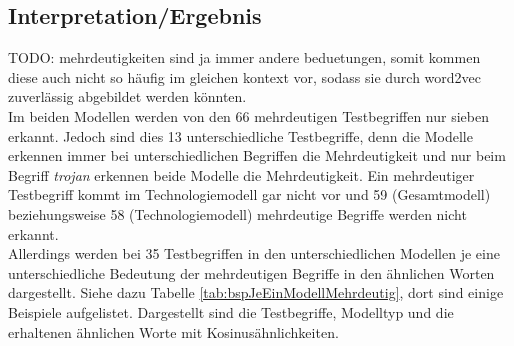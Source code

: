 \documentclass[12pt,a4paper]{report}
\begin{document}
		
		\subsection*{Interpretation/Ergebnis}
		
TODO: mehrdeutigkeiten sind ja immer andere beduetungen, somit kommen diese auch nicht so häufig im gleichen kontext vor, sodass sie durch word2vec zuverlässig abgebildet werden könnten.\\

		
		Im beiden Modellen werden von den 66 mehrdeutigen Testbegriffen nur sieben erkannt. Jedoch sind dies 13 unterschiedliche Testbegriffe, denn die Modelle erkennen immer bei unterschiedlichen Begriffen die Mehrdeutigkeit und nur beim Begriff \textit{trojan} erkennen beide Modelle die Mehrdeutigkeit. Ein mehrdeutiger Testbegriff kommt im Technologiemodell gar nicht vor und 59 (Gesamtmodell) beziehungsweise 58 (Technologiemodell) mehrdeutige Begriffe werden nicht erkannt. \\
Allerdings werden bei 35 Testbegriffen in den unterschiedlichen Modellen je eine unterschiedliche Bedeutung der mehrdeutigen Begriffe in den ähnlichen Worten dargestellt. Siehe dazu Tabelle \ref{tab:bspJeEinModellMehrdeutig}, dort sind einige Beispiele aufgelistet. Dargestellt sind die Testbegriffe, Modelltyp und die erhaltenen ähnlichen Worte mit Kosinusähnlichkeiten.\\
		
\end{document}
